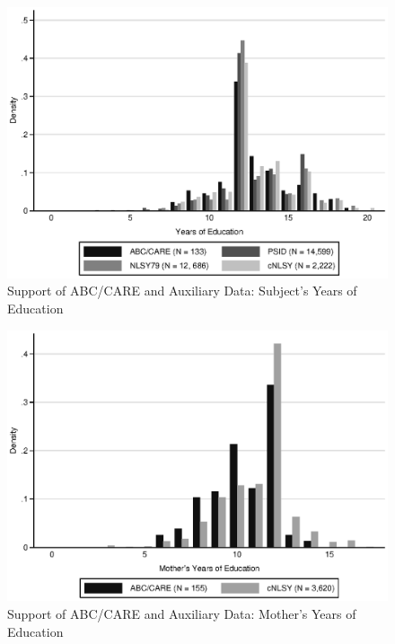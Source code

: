 \documentclass[static]{JJH-Beamer}
\begin{document}
\begin{frame}
 \addtocounter{framenumber}{-1}

\begin{figure}[H]\addtocounter{figure}{-1}
\caption{Support of ABC/CARE and Auxiliary Data: Subject's Years of Education} \label{fig:support_educ}
\begin{center}
\includegraphics[width=.75\textwidth]{AppOutput/Methodology/support_educ.eps}
\end{center}
\end{figure}

\end{frame}

\begin{frame}
 \addtocounter{framenumber}{-1}

\begin{figure}[H]\addtocounter{figure}{-1}
\caption{Support of ABC/CARE and Auxiliary Data: Mother's Years of Education} \label{fig:support_meduc}
\begin{center}
\includegraphics[width=.75\textwidth]{AppOutput/Methodology/support_momed.eps}
\end{center}
\end{figure}

\end{frame}
\end{document}
